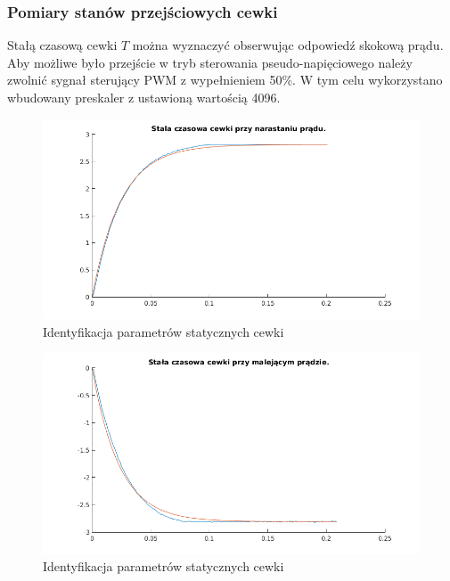 \subsubsection{Pomiary stanów przejściowych cewki}

Stałą czasową cewki $T$ można wyznaczyć obserwując odpowiedź skokową prądu. Aby możliwe było przejście w tryb sterowania pseudo-napięciowego należy zwolnić sygnał sterujący PWM z wypełnieniem 50\%. W tym celu wykorzystano wbudowany preskaler z ustawioną wartością 4096.
\begin{figure}[H]
\centering
\includegraphics[scale=0.85]{img/identyfikacja_stala_narastanie_0245.png}
\caption{Identyfikacja parametrów statycznych cewki}
\label{rys:cewka_k_uc}
\end{figure}

\begin{figure}[H]
\centering
\includegraphics[scale=0.85]{img/identyfikacja_stala_opadanie_0230.png}
\caption{Identyfikacja parametrów statycznych cewki}
\label{rys:cewka_k_uc}
\end{figure}



